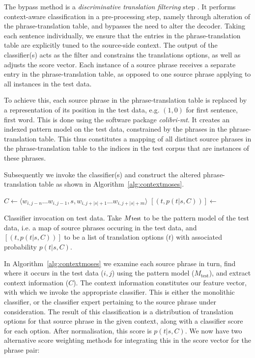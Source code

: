 The bypass method is a \emph{discriminative translation filtering}
step \citep{Rejwanul+11}. It performs context-aware classification in
a pre-processing step, namely through alteration of the
phrase-translation table, and bypasses the need to alter the
decoder. Taking each sentence individually, we ensure that the entries
in the phrase-translation table are explicitly tuned to the
source-side context. The output of the classifier(s) acts as the
filter and constrains the translations options, as well as adjusts the
score vector. Each instance of a source phrase receives a separate entry
in the phrase-translation table, as opposed to one source phrase
applying to all instances in the test data.

To achieve this, each source phrase in the phrase-translation table is
replaced by a representation of its position in the test data, e.g.
$(1,0)$ for first sentence, first word.  This is done using the
software package \emph{colibri-mt}. It creates an indexed pattern
model on the test data, constrained by the phrases in the
phrase-translation table. This thus constitutes a mapping of all
distinct source phrases in the phrase-translation table to the indices
in the test corpus that are instances of these phrases.

Subsequently we invoke the classifier(s) and construct the altered
phrase-translation table as shown in Algorithm~\ref{alg:contextmoses}.

\begin{algorithm}
\begin{algorithmic}
    \State $C \gets \langle w_{i,j-n} \ldots w_{i,j-1}, s, w_{i,j+|s|+1} \ldots w_{i,j+|s|+m} \rangle$
    \State $[(t, p(t|s,C) )] \gets$ 
  \EndFor
\EndFor
\end{algorithmic}
\caption{Classifier invocation on test data. Take $M{\footnotesize\text{test}}$ to be the pattern
model of the test data, i.e. a map of source phrases occuring in the test
data, and $[(t,p(t|s,C))]$ to be a list of translation options ($t$) with
associated probability $p(t|s,C)$.}
\label{alg:contextmoses}
\end{algorithm}

In Algorithm~\ref{alg:contextmoses} we examine each source phrase in turn, find
where it occurs in the test data ($i,j$) using the pattern model
($M_{\text{test}}$), and extract context information ($C$). The context
information constitutes our feature vector, with which we invoke the
appropriate classifier. This is either the monolithic classifier, or the
classifier expert pertaining to the source phrase under consideration. The
result of this classification is a distribution of translation options for that
source phrase in the given context, along with a classifier score for each
option. After normalisation, this score is $p(t|s,C)$. We now have two alternative score
weighting methods for integrating this in the score vector for the phrase pair:

